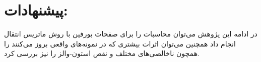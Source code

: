 


\section{پیشنهادات:}
در ادامه این پژوهش می‌توان محاسبات را برای صفحات بورفین با روش ماتریس انتقال انجام داد همچنین می‌توان اثرات بیشتری که در نمونه‌های واقعی بروز می‌کنند را همچون ناخالصی‌های مختلف و نقص استون-والز را نیز بررسی کرد.